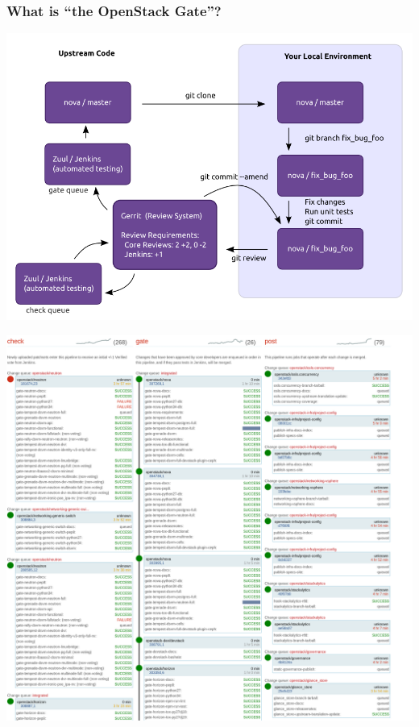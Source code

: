 \documentclass[aspectratio=169,11pt,hyperref={colorlinks=true}]{beamer}
\begin{document}
\begin{frame}
    \frametitle{What is ``the OpenStack Gate''?}
	\begin{center}
		\includegraphics[width=.8\textwidth]{code_review.png}
	\end{center}
\end{frame}

\begin{frame}
\begin{center}
    \includegraphics[width=.8\textwidth]{ZuulStatus.png}
\end{center}
\end{frame}
\end{document}
